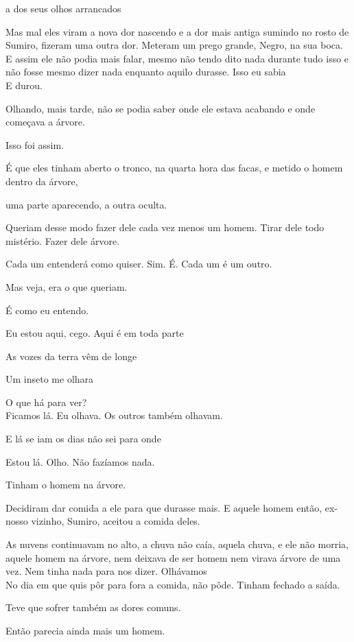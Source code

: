 a dos seus olhos arrancados

Mas mal eles viram a nova dor nascendo e a dor mais antiga sumindo no
rosto de Sumiro, fizeram uma outra dor. Meteram um prego grande, Negro,
na sua boca. E assim ele não podia mais falar, mesmo não tendo dito nada
durante tudo isso e não fosse mesmo dizer nada enquanto aquilo durasse.
Isso eu sabia\\

E durou.

Olhando, mais tarde, não se podia saber onde ele estava acabando e onde
começava a árvore.

Isso foi assim.

É que eles tinham aberto o tronco, na quarta hora das facas, e metido o
homem dentro da árvore,

uma parte aparecendo, a outra oculta.

Queriam desse modo fazer dele cada vez menos um homem. Tirar dele todo
mistério. Fazer dele árvore.

Cada um entenderá como quiser. Sim. É. Cada um é um outro.

Mas veja, era o que queriam.

É como eu entendo.

Eu estou aqui, cego. Aqui é em toda parte

As vozes da terra vêm de longe

Um inseto me olhara

O que há para ver?\\

Ficamos lá. Eu olhava. Os outros também olhavam.

E lá se iam os dias não sei para onde

Estou lá. Olho. Não fazíamos nada.

Tinham o homem na árvore.

Decidiram dar comida a ele para que durasse mais. E aquele homem então,
ex-nosso vizinho, Sumiro, aceitou a comida deles.

As nuvens continuavam no alto, a chuva não caía, aquela chuva, e ele não
morria, aquele homem na árvore, nem deixava de ser homem nem virava
árvore de uma vez. Nem tinha nada para nos dizer. Olhávamos\\

No dia em que quis pôr para fora a comida, não pôde. Tinham fechado a
saída.

Teve que sofrer também as dores comuns.

Então parecia ainda mais um homem.

